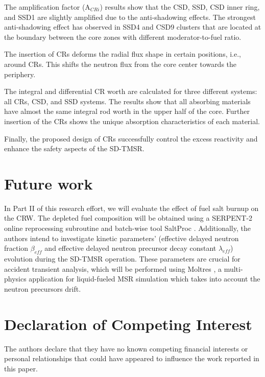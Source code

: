 The amplification factor (A$_{CRi}$) results show that the CSD, SSD, CSD inner ring, and SSD1 are slightly amplified due to the anti-shadowing effects. The strongest anti-shadowing effect has observed in SSD4 and CSD9 clusters that are located at the boundary between the core zones with different moderator-to-fuel ratio.

The insertion of CRs deforms the radial flux shape in certain positions, i.e., around CRs. This shifts the neutron flux from the core center towards the periphery.

The integral and differential CR worth are calculated for three 
different systems: all CRs, CSD, and SSD systems. The results show 
that all absorbing materials have almost the same integral rod worth in the 
upper half of the core. Further insertion of the CRs shows the unique 
absorption characteristics of each material.

Finally, the proposed design of CRs successfully control the excess reactivity and enhance the safety aspects of the SD-TMSR.

\section{Future work}
In Part II of this research effort, we will evaluate the effect of fuel salt 
burnup on the CRW. The depleted fuel composition will be obtained using a
SERPENT-2 online reprocessing subroutine \cite{aufiero2013extended} and 
batch-wise tool SaltProc \cite{rykhlevskii_arfc/saltproc_2018, 
rykhlevskii_milestone_2019}. Additionally, the authors intend to investigate 
kinetic parameters' (effective delayed neutron fraction $\beta_{eff}$ and 
effective delayed neutron precursor decay constant $\lambda_{eff}$) evolution 
during the SD-TMSR operation. These parameters are crucial for accident 
transient analysis, which will be performed using Moltres 
\cite{lindsay_introduction_2018}, a multi-physics application for liquid-fueled MSR 
simulation which takes into account the neutron precursors drift.

\section{Declaration of Competing Interest}

The authors declare that they have no known competing financial interests or personal relationships that could have appeared to influence the work reported in this paper.
